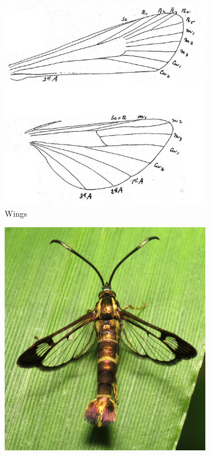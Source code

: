 \documentclass[letterpaper, 11pt]{article}
\begin{document}
\begin{figure}[ht!]
    \centering
    \begin{subfigure}[ht!]{0.4\textwidth}
        \includegraphics[width=\textwidth]{SesiidWings}
        \caption{Wings \citep[][Fig. 8]{bhl118765}}
        \label{fig:sesiid1}
    \end{subfigure}
    \qquad %
    \begin{subfigure}[ht!]{0.40\textwidth}
        \includegraphics[width=\textwidth]{SesiidHabitus}

\end{subfigure}
\end{figure}
\end{document}
